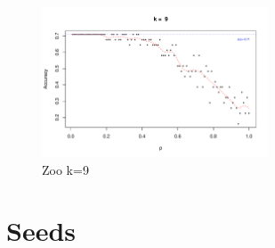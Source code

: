 \documentclass{article}
\begin{document}
\begin{figure}
 \centering
 \includegraphics[width=0.6\textwidth]{./figures/Zoo_k9.pdf}
 \caption{Zoo k=9}
 \label{fig:Zoo9}
\end{figure}

\FloatBarrier
\section{Seeds}
\end{document}
